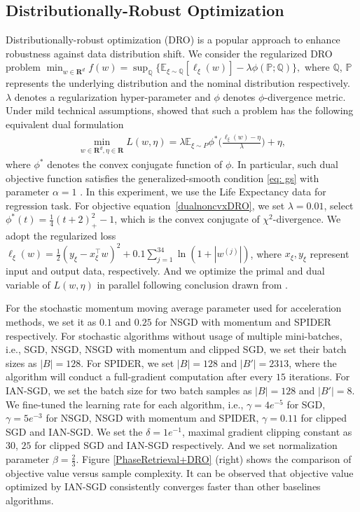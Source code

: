 \documentclass[10pt]{article} %
\def\eqref#1{equation~\ref{#1}}
\begin{document}
\subsection{Distributionally-Robust Optimization}
Distributionally-robust optimization (DRO) is a popular approach to enhance robustness against data distribution shift. We consider the regularized DRO problem 
$
    \min_{w\in \mathbf{R}^d} f(w)=\sup_{\mathbb{Q}} \big\{\mathbb{E}_{\xi\sim \mathbb{Q}}[\ell_{\xi}(w)]-\lambda \phi(\mathbb{P};\mathbb{Q})\big \},
$
where $\mathbb{Q}$, $\mathbb{P}$ represents the underlying distribution and the nominal distribution respectively. $\lambda$ denotes a regularization hyper-parameter and $\phi$ denotes $\phi$-divergence metric. Under mild technical assumptions, \citet{jin2021nonconvex} showed that such a problem has the following equivalent dual formulation
\begin{align}
    \min_{w\in \mathbf{R}^d,\eta\in \mathbf{R}} L(w,\eta) = \lambda \mathbb{E}_{\xi \sim P} \phi^*\Big(\frac{\ell_{\xi}(w)-\eta}{\lambda}\Big)+\eta,
    \label{dualnoncvxDRO}
\end{align}
where $\phi^*$ denotes the convex conjugate function of $\phi$. In particular, such dual objective function satisfies the generalized-smooth condition \ref{eq: gs} with parameter $\alpha = 1$ \citep{jin2021nonconvex,pmlr-v202-chen23ar}. In this experiment, we use the Life Expectancy data {\citep{life_expectancy_data}} for regression task. For objective \eqref{dualnoncvxDRO}, we set $\lambda = 0.01$, select $\phi^*(t)= \frac{1}{4}(t+2)_+^2-1$, which is the convex conjugate of $\chi^2$-divergence. We adopt the regularized loss $\ell_{\xi}({w})=\frac{1}{2}(y_{\xi}-{x}_{\xi}^{\top}{w})^2+0.1 \sum_{j=1}^{34} \ln (1+|w^{(j)}|)$, where $x_{\xi},y_{\xi}$ represent input and output data, respectively. And we optimize the primal and dual variable of $L(w,\eta)$ in parallel following conclusion drawn from \citet{jin2021nonconvex}.

For the stochastic momentum moving average parameter used for acceleration methods, we set it as $0.1$ and $0.25$ for NSGD with momentum and SPIDER respectively. For stochastic algorithms without usage of multiple mini-batches, i.e., SGD, NSGD, NSGD with momentum and clipped SGD, we set their batch sizes as $|B|=128$. For SPIDER, we set $|B|=128$ and $|B'|=2313$, where the algorithm will conduct a full-gradient computation after every $15$ iterations. For IAN-SGD, we set the batch size for two batch samples as $|B| = 128$ and $|B'| = 8$. We fine-tuned the learning rate for each algorithm, i.e., $\gamma = 4e^{-5}$ for SGD, $\gamma = 5e^{-3}$ for NSGD, NSGD with momentum and SPIDER, $\gamma = 0.11$ for clipped SGD and IAN-SGD. We set the $\delta = 1e^{-1}$, maximal gradient clipping constant as $30$, $25$ for clipped SGD and IAN-SGD respectively. And we set normalization parameter $\beta=\frac{2}{3}$. Figure \ref{PhaseRetrieval+DRO} (right) shows the comparison of objective value versus sample complexity. It can be observed that objective value optimized by IAN-SGD consistently converges faster than other baselines algorithms.
\end{document}
